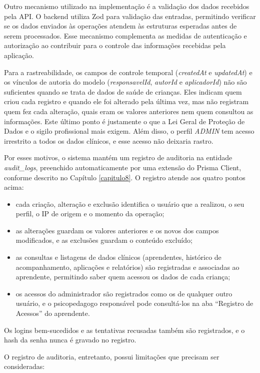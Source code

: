 Outro mecanismo utilizado na implementação é a validação dos dados recebidos pela API. O backend utiliza Zod para validação das entradas, permitindo verificar se os dados enviados às operações atendem às estruturas esperadas antes de serem processados. Esse mecanismo complementa as medidas de autenticação e autorização ao contribuir para o controle das informações recebidas pela aplicação.

Para a rastreabilidade, os campos de controle temporal (\textit{createdAt} e \textit{updatedAt}) e os vínculos de autoria do modelo (\textit{responsavelId}, \textit{autorId} e \textit{aplicadorId}) não são suficientes quando se trata de dados de saúde de crianças. Eles indicam quem criou cada registro e quando ele foi alterado pela última vez, mas não registram quem fez cada alteração, quais eram os valores anteriores nem quem consultou as informações. Este último ponto é justamente o que a Lei Geral de Proteção de Dados e o sigilo profissional mais exigem. Além disso, o perfil \textit{ADMIN} tem acesso irrestrito a todos os dados clínicos, e esse acesso não deixaria rastro.

Por esses motivos, o sistema mantém um registro de auditoria na entidade \textit{audit\_logs}, preenchido automaticamente por uma extensão do Prisma Client, conforme descrito no Capítulo \ref{capitulo8}. O registro atende aos quatro pontos acima:

\begin{itemize}
    \item cada criação, alteração e exclusão identifica o usuário que a realizou, o seu perfil, o IP de origem e o momento da operação;
    \item as alterações guardam os valores anteriores e os novos dos campos modificados, e as exclusões guardam o conteúdo excluído;
    \item as consultas e listagens de dados clínicos (aprendentes, histórico de acompanhamento, aplicações e relatórios) são registradas e associadas ao aprendente, permitindo saber quem acessou os dados de cada criança;
    \item os acessos do administrador são registrados como os de qualquer outro usuário, e o psicopedagogo responsável pode consultá-los na aba ``Registro de Acessos'' do aprendente.
\end{itemize}

Os logins bem-sucedidos e as tentativas recusadas também são registrados, e o hash da senha nunca é gravado no registro.

O registro de auditoria, entretanto, possui limitações que precisam ser consideradas:

